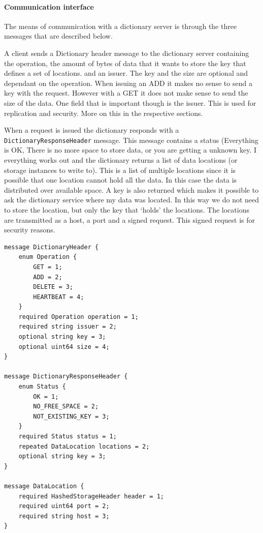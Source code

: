 \documentclass[12pt,a4paper]{scrartcl}
\begin{document}
\paragraph{Communication interface}
The means of communication with a dictionary server is through the three messages that are described below. 

A client sends a Dictionary header message to the dictionary server containing the operation, the amount of bytes of data that it wants to store the key that defines a set of locations. and an issuer. The key and the size are optional and dependant on the operation. When issuing an ADD it makes no sense to send a key with the request. However with a GET it does not make sense to send the size of the data. One field that is important though is the issuer. This is used for replication and security. More on this in the respective sections.

When a request is issued the dictionary responds with a \texttt{DictionaryResponseHeader} message. This message contains a status (Everything is OK, There is no more space to store data, or you are getting a unknown key. I everything works out and the dictionary returns a list of data locations (or storage instances to write to). This is a list of multiple locations since it is possible that one location cannot hold all the data. In this case the data is distributed over available space. A key is also returned which makes it possible to ask the dictionary service where my data was located. In this way we do not need to store the location, but only the key that `holds' the locations. The locations are transmitted as a host, a port and a signed request. This signed request is for security reasons.

\begin{verbatim}
message DictionaryHeader {
    enum Operation {
        GET = 1;
        ADD = 2;
        DELETE = 3;
        HEARTBEAT = 4;
    }
    required Operation operation = 1;
    required string issuer = 2;
    optional string key = 3;
    optional uint64 size = 4;
}

message DictionaryResponseHeader {
    enum Status {
        OK = 1;
        NO_FREE_SPACE = 2;
        NOT_EXISTING_KEY = 3;
    }
    required Status status = 1;
    repeated DataLocation locations = 2;
    optional string key = 3;
}

message DataLocation {
    required HashedStorageHeader header = 1;
    required uint64 port = 2;
    required string host = 3;
}
\end{verbatim}
\end{document}
